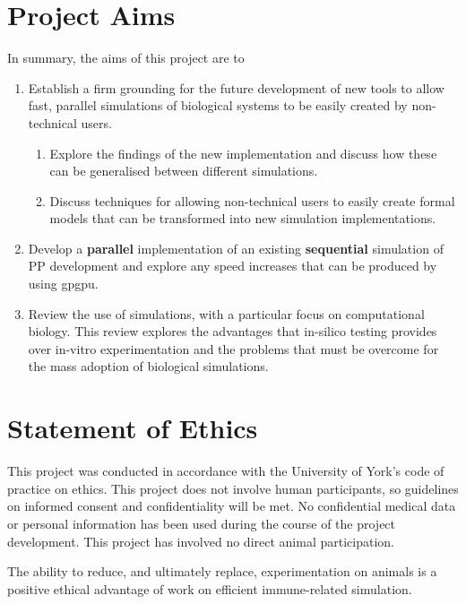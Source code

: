 \documentclass{UoYCSproject}
\begin{document}
\section{Project Aims}
\label{aims}
In summary, the aims of this project are to
\begin{enumerate}
    \item Establish a firm grounding for the future development of new tools to allow fast, parallel simulations of biological systems to be easily created by non-technical users.
    \begin{enumerate}
        \item Explore the findings of the new implementation and discuss how these can be generalised between different simulations.
        \item Discuss techniques for allowing non-technical users to easily create formal models that can be transformed into new simulation implementations.
    \end{enumerate}
    \item Develop a \textbf{parallel} implementation of an existing \textbf{sequential} simulation of \gls{PP} development and explore any speed increases that can be produced by using \gls{gpgpu}.
    \item Review the use of simulations, with a particular focus on computational biology. This review explores the advantages that in-silico testing provides over \gls{in-vitro} experimentation and the problems that must be overcome for the mass adoption of biological simulations.
    
\end{enumerate}

\section{Statement of Ethics}
This project was conducted in accordance with the University of York's code of practice on ethics.
This project does not involve human participants, so guidelines on informed consent and confidentiality will be met. No confidential medical data or personal information has been used during the course of the project development. This project has involved no direct animal participation.

The ability to reduce, and ultimately replace, experimentation on animals is a positive ethical advantage of work on efficient immune-related simulation.
\end{document}
